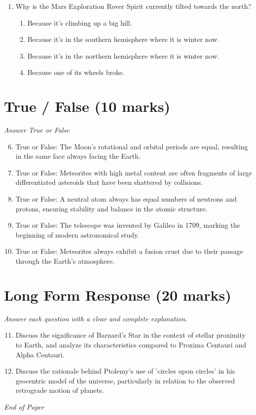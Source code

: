 \documentclass[12pt]{article}
\begin{document}
\begin{enumerate}[label=\arabic*.]
\begin{enumerate}[label=(\alph*)]
    \item Cassiopeia
    \item Cepheus
\end{enumerate}
\item Why is the Mars Exploration Rover Spirit currently tilted towards the north?
\begin{enumerate}[label=(\alph*)]
    \item Because it's climbing up a big hill.
    \item Because it's in the southern hemisphere where it is winter now.
    \item Because it's in the northern hemisphere where it is winter now.
    \item Because one of its wheels broke.
\end{enumerate}
\end{enumerate}

\section*{True / False (10 marks)}
\textit{Answer True or False}
\begin{enumerate}[label=\arabic*.]
\setcounter{enumi}{5}
\item True or False: The Moon's rotational and orbital periods are equal, resulting in the same face always facing the Earth.
\item True or False: Meteorites with high metal content are often fragments of large differentiated asteroids that have been shattered by collisions.
\item True or False: A neutral atom always has equal numbers of neutrons and protons, ensuring stability and balance in the atomic structure.
\item True or False: The telescope was invented by Galileo in 1709, marking the beginning of modern astronomical study.
\item True or False: Meteorites always exhibit a fusion crust due to their passage through the Earth's atmosphere.
\end{enumerate}

\section*{Long Form Response (20 marks)}
\textit{Answer each question with a clear and complete explanation.}
\begin{enumerate}[label=\arabic*.]
\setcounter{enumi}{10}
\item Discuss the significance of Barnard's Star in the context of stellar proximity to Earth, and analyze its characteristics compared to Proxima Centauri and Alpha Centauri.
\item Discuss the rationale behind Ptolemy's use of 'circles upon circles' in his geocentric model of the universe, particularly in relation to the observed retrograde motion of planets.
\end{enumerate}

\vfill
\noindent\textit{End of Paper}
\end{document}
